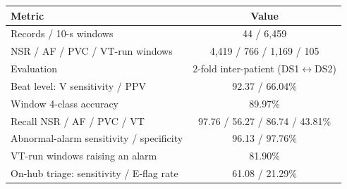 \begin{tabular}{lc}
\toprule
Metric & Value\\
\midrule
Records / 10-s windows & 44 / 6,459\\
NSR / AF / PVC / VT-run windows & 4,419 / 766 / 1,169 / 105\\
Evaluation & 2-fold inter-patient (DS1$\leftrightarrow$DS2)\\
\midrule
Beat level: V sensitivity / PPV & 92.37 / 66.04\%\\
Window 4-class accuracy & 89.97\%\\
Recall NSR / AF / PVC / VT & 97.76 / 56.27 / 86.74 / 43.81\%\\
Abnormal-alarm sensitivity / specificity & 96.13 / 97.76\%\\
VT-run windows raising an alarm & 81.90\%\\
On-hub triage: sensitivity / E-flag rate & 61.08 / 21.29\%\\
\bottomrule
\end{tabular}
